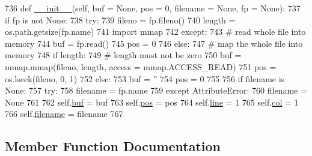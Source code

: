 \begin{DoxyCode}
736     \textcolor{keyword}{def }\hyperlink{classsmacc__viewer_1_1xdot_1_1xdot_1_1Lexer_a21fd2072c3fcad9d7bf119ffea49e659}{\_\_init\_\_}(self, buf = None, pos = 0, filename = None, fp = None):
737         \textcolor{keywordflow}{if} fp \textcolor{keywordflow}{is} \textcolor{keywordflow}{not} \textcolor{keywordtype}{None}:
738             \textcolor{keywordflow}{try}:
739                 fileno = fp.fileno()
740                 length = os.path.getsize(fp.name)
741                 \textcolor{keyword}{import} mmap
742             \textcolor{keywordflow}{except}:
743                 \textcolor{comment}{# read whole file into memory}
744                 buf = fp.read()
745                 pos = 0
746             \textcolor{keywordflow}{else}:
747                 \textcolor{comment}{# map the whole file into memory}
748                 \textcolor{keywordflow}{if} length:
749                     \textcolor{comment}{# length must not be zero}
750                     buf = mmap.mmap(fileno, length, access = mmap.ACCESS\_READ)
751                     pos = os.lseek(fileno, 0, 1)
752                 \textcolor{keywordflow}{else}:
753                     buf = \textcolor{stringliteral}{''}
754                     pos = 0
755 
756             \textcolor{keywordflow}{if} filename \textcolor{keywordflow}{is} \textcolor{keywordtype}{None}:
757                 \textcolor{keywordflow}{try}:
758                     filename = fp.name
759                 \textcolor{keywordflow}{except} AttributeError:
760                     filename = \textcolor{keywordtype}{None}
761 
762         self.\hyperlink{classsmacc__viewer_1_1xdot_1_1xdot_1_1Lexer_ae6f555ad406cdd55d65f8d35d5f26825}{buf} = buf
763         self.\hyperlink{classsmacc__viewer_1_1xdot_1_1xdot_1_1Lexer_a5748d2ef8e2cd8390bec0bd89621c2d6}{pos} = pos
764         self.\hyperlink{classsmacc__viewer_1_1xdot_1_1xdot_1_1Lexer_a0176a7344cbcc6622d7153fa8141440c}{line} = 1
765         self.\hyperlink{classsmacc__viewer_1_1xdot_1_1xdot_1_1Lexer_a1f662e52d39cd1cdddb5cfc02e549018}{col} = 1
766         self.\hyperlink{classsmacc__viewer_1_1xdot_1_1xdot_1_1Lexer_aeec6d9f9d2545d6a4bc01b386b81ac12}{filename} = filename
767 
\end{DoxyCode}


\subsection{Member Function Documentation}
